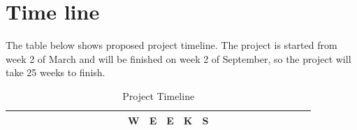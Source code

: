\documentclass[11pt]{article}
\begin{document}
	\section{Time line}
	The table below shows proposed project timeline. The project is started from week 2 of March and will be finished on week 2 of September, so the project will take 25 weeks to finish. 
	\begin{table}[H]
		\centering
		\caption{Project Timeline}
		\label{timeline_table}
		\begin{tabular}{lp{0.1cm}p{0.1cm}p{0.1cm}p{0.1cm}p{0.1cm}p{0.1cm}p{0.1cm}p{0.1cm}p{0.1cm}p{0.1cm}p{0.1cm}p{0.1cm}p{0.1cm}p{0.1cm}p{0.1cm}p{0.1cm}p{0.1cm}p{0.1cm}p{0.1cm}p{0.1cm}p{0.1cm}p{0.1cm}p{0.1cm}p{0.1cm}p{0.1cm}p{0.1cm}} \hline
			&                                                                      &                                               &                                               &                                               &                                               &                                               &                                               &                                               &                                               &                                               &                                               & W                                             & E                                             & E                                             & K                                             & S                                             &                                               &                                               &                                               &                                               &                                               &                                               &                                               &                                               &                                                                                              \\ \hline

\end{tabular}
\end{table}
\end{document}
